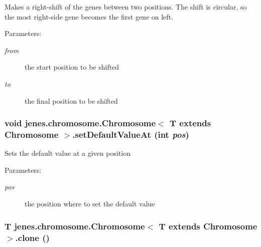 Makes a right-shift of the genes between two positions. The shift is circular, so the most right-side gene becomes the first gene on left. 

\begin{Desc}
\item[Parameters:]
\begin{description}
\item[{\em from}]the start position to be shifted \item[{\em to}]the final position to be shifted \end{description}
\end{Desc}
\hypertarget{interfacejenes_1_1chromosome_1_1_chromosome_3_01_t_01extends_01_chromosome_01_4_7da893369a724b9bdde694ffd07e05ef}{
\subsubsection[setDefaultValueAt]{\setlength{\rightskip}{0pt plus 5cm}void jenes.chromosome.Chromosome$<$ T extends Chromosome $>$.setDefaultValueAt (int {\em pos})}}
\label{interfacejenes_1_1chromosome_1_1_chromosome_3_01_t_01extends_01_chromosome_01_4_7da893369a724b9bdde694ffd07e05ef}


Sets the default value at a given position 

\begin{Desc}
\item[Parameters:]
\begin{description}
\item[{\em pos}]the position where to set the default value \end{description}
\end{Desc}
\hypertarget{interfacejenes_1_1chromosome_1_1_chromosome_3_01_t_01extends_01_chromosome_01_4_853c4aaab715bdcc4f89ed84dfbe1f00}{
\subsubsection[clone]{\setlength{\rightskip}{0pt plus 5cm}T jenes.chromosome.Chromosome$<$ T extends Chromosome $>$.clone ()}}
\label{interfacejenes_1_1chromosome_1_1_chromosome_3_01_t_01extends_01_chromosome_01_4_853c4aaab715bdcc4f89ed84dfbe1f00}


